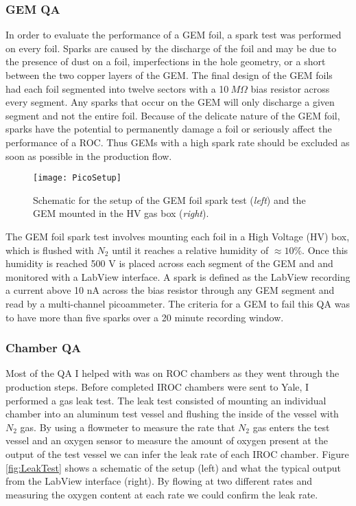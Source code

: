 \subsubsection{GEM QA}

In order to evaluate the performance of a GEM foil, a spark test was performed on every foil.  Sparks are caused by the discharge of the foil and may be due to the presence of dust on a foil, imperfections in the hole geometry, or a short between the two copper layers of the GEM.  The final design of the GEM foils had each foil segmented into twelve sectors with a 10$\: M \Omega$ bias resistor across every segment.  Any sparks that occur on the GEM will only discharge a given segment and not the entire foil.  Because of the delicate nature of the GEM foil, sparks have the potential to permanently damage a foil or seriously affect the performance of a ROC.  Thus GEMs with a high spark rate should be excluded as soon as possible in the production flow.

\begin{figure}[h]
\texttt{[image: PicoSetup]}
\centering
\caption{Schematic for the setup of the GEM foil spark test (\textit{left})\cite{Brucken:2018rej} and the GEM mounted in the HV gas box (\textit{right}). }
\label{fig:PicoSetup}
\end{figure}

\noindent
The GEM foil spark test involves mounting each foil in a High Voltage (HV) box, which is flushed with $N_{2}$ until it reaches a relative humidity of $\approx 10\%$.  Once this humidity is reached 500 V is placed across each segment of the GEM and and monitored with a LabView interface.  A spark is defined as the LabView recording a current above 10 nA across the bias resistor through any GEM segment and read by a multi-channel picoammeter.  The criteria for a GEM to fail this QA was to have more than five sparks over a 20 minute recording window.

\subsubsection{Chamber QA}

Most of the QA I helped with was on ROC chambers as they went through the production steps.  Before completed IROC chambers were sent to Yale, I performed a gas leak test.  The leak test consisted of mounting an individual chamber into an aluminum test vessel and flushing the inside of the vessel with $N_{2}$ gas.  By using a flowmeter to measure the rate that $N_{2}$ gas enters the test vessel and an oxygen sensor to measure the amount of oxygen present at the output of the test vessel we can infer the leak rate of each IROC chamber.  Figure \ref{fig:LeakTest} shows a schematic of the setup (left) and what the typical output from the LabView interface (right).  By flowing at two different rates and measuring the oxygen content at each rate we could confirm the leak rate.

